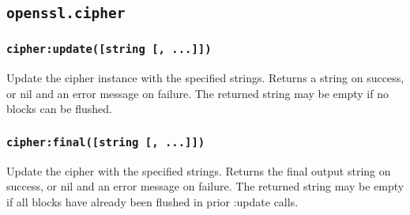 \documentclass[11pt, oneside]{memoir}
\newcommand*{\fn}[1]{\texttt{#1}\xspace}
\newcounter{toccols}
\newenvironment{Module}[1]{
	\subsection{\texttt{#1}}
	\addtocontents{toc}{
		\protect\begin{multicols}{\value{toccols}}
	}
}{
	\addtocontents{toc}{\protect\end{multicols}}
}
\begin{document}
\begin{Module}{openssl.cipher}
\subsubsection[\fn{cipher:update}]{\fn{cipher:update([string [, ...]])}}

Update the cipher instance with the specified strings. Returns a string on success, or nil and an error message on failure. The returned string may be empty if no blocks can be flushed.

\subsubsection[\fn{cipher:final}]{\fn{cipher:final([string [, ...]])}}

Update the cipher with the specified strings. Returns the final output string on success, or nil and an error message on failure. The returned string may be empty if all blocks have already been flushed in prior :update calls.

\end{Module}
\end{document}

